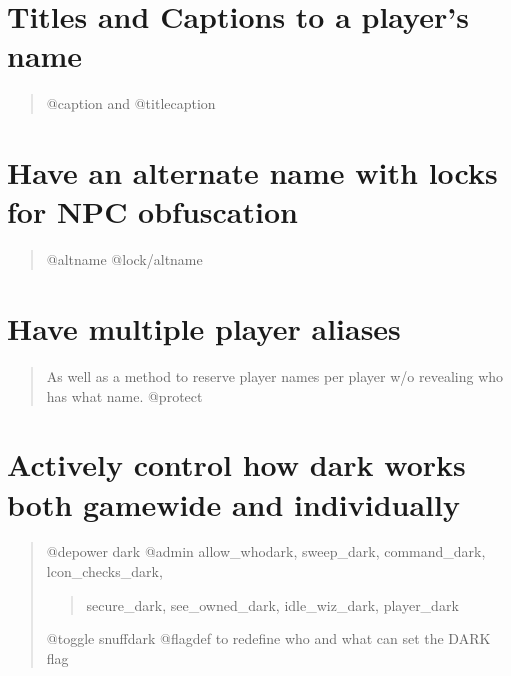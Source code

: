 \documentclass[letterpaper,10pt,english]{sphinxmanual}
\begin{document}
\section{Titles and Captions to a player’s name}
\label{\detokenize{01-intro:titles-and-captions-to-a-player-s-name}}\begin{quote}

\sphinxAtStartPar
@caption and @titlecaption
\end{quote}


\section{Have an alternate name with locks for NPC obfuscation}
\label{\detokenize{01-intro:have-an-alternate-name-with-locks-for-npc-obfuscation}}\begin{quote}

\sphinxAtStartPar
@altname
@lock/altname
\end{quote}


\section{Have multiple player aliases}
\label{\detokenize{01-intro:have-multiple-player-aliases}}\begin{quote}

\sphinxAtStartPar
As well as a method
to reserve player names per player w/o revealing who has what
name.
@protect
\end{quote}


\section{Actively control how dark works both game\sphinxhyphen{}wide and individually}
\label{\detokenize{01-intro:actively-control-how-dark-works-both-game-wide-and-individually}}\begin{quote}

\sphinxAtStartPar
@depower dark
@admin allow\_whodark, sweep\_dark, command\_dark, lcon\_checks\_dark,
\begin{quote}

\sphinxAtStartPar
secure\_dark, see\_owned\_dark, idle\_wiz\_dark, player\_dark
\end{quote}

\sphinxAtStartPar
@toggle snuffdark
@flagdef to redefine who and what can set the DARK flag
\end{quote}
\end{document}
